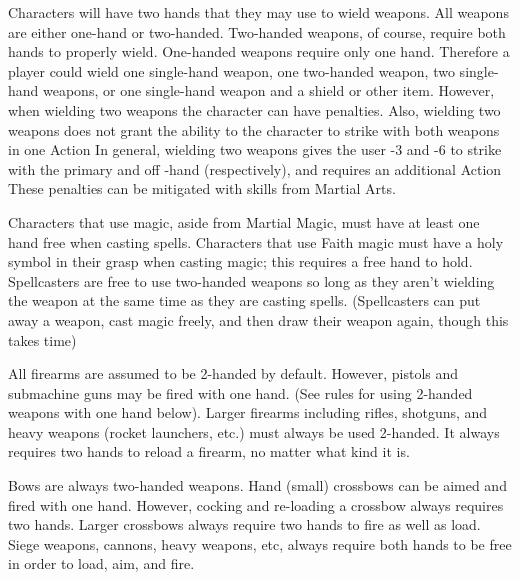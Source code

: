 \documentclass[twoside]{book}
\begin{document}
    {  
    Characters will have two hands that they may use to
               wield weapons. All weapons are either one-hand or
               two-handed. Two-handed weapons, of course, require both
               hands to properly wield. One-handed weapons require only
               one hand. Therefore a player could wield one single-hand
               weapon, one two-handed weapon, two single-hand weapons, or
               one single-hand weapon and a shield or other item.
               However, when wielding two weapons the character can have
               penalties. Also, wielding two weapons does not grant the
               ability to the character to strike with both weapons in
               one Action In general, wielding two weapons gives the user
               -3 and -6 to strike with the primary and off -hand
               (respectively), and requires an additional Action These
               penalties can be mitigated with skills from Martial Arts.
               
    }
  
    {  
    Characters that use magic, aside from Martial Magic,
               must have at least one hand free when casting spells.
               Characters that use Faith magic must have a holy symbol in
               their grasp when casting magic; this requires a free hand
               to hold. Spellcasters are free to use two-handed weapons
               so long as they aren't wielding the weapon at the
               same time as they are casting spells. (Spellcasters can
               put away a weapon, cast magic freely, and then draw their
               weapon again, though this takes time) 
    }
  
    {  
    All firearms are assumed to be 2-handed by default.
               However, pistols and submachine guns may be fired with one
               hand. (See rules for using 2-handed weapons with one hand
               below). Larger firearms including rifles, shotguns, and
               heavy weapons (rocket launchers, etc.) must always be used
               2-handed. It always requires two hands to reload a
               firearm, no matter what kind it is. 
    }
  
    {  
    Bows are always two-handed weapons. Hand (small)
               crossbows can be aimed and fired with one hand. However,
               cocking and re-loading a crossbow always requires two
               hands. Larger crossbows always require two hands to fire
               as well as load. Siege weapons, cannons, heavy weapons,
               etc, always require both hands to be free in order to
               load, aim, and fire. 
    }
  
\end{document}
